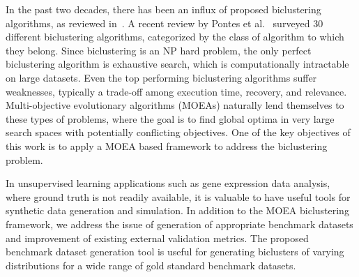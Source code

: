 In the past two decades, there has been an influx of proposed biclustering algorithms, as reviewed in~\cite{prelic2006systematic, eren2012comparative, oghabian2014biclustering, pontes2015biclustering, roy2016analysis}.
A recent review by Pontes et al.~\cite{pontes2015biclustering} surveyed 30 different biclustering algorithms, categorized by the class of algorithm to which they belong.
Since biclustering is an NP hard problem, the only perfect biclustering algorithm is exhaustive search, which is computationally intractable on large datasets.
Even the top performing biclustering algorithms suffer weaknesses, typically a trade-off among execution time, recovery, and relevance.
Multi-objective evolutionary algorithms (MOEAs) naturally lend themselves to these types of problems, where the goal is to find global optima in very large search spaces with potentially conflicting objectives. One of the key objectives of this work is to apply a MOEA based framework to address the biclustering problem.

In unsupervised learning applications such as gene expression data analysis, where ground truth is not readily available, it is valuable to have useful tools for synthetic data generation and simulation.
In addition to the MOEA biclustering framework, we address the issue of generation of appropriate benchmark datasets and improvement of existing external validation metrics.
The proposed benchmark dataset generation tool is useful for generating biclusters of varying distributions for a wide range of gold standard benchmark datasets.


